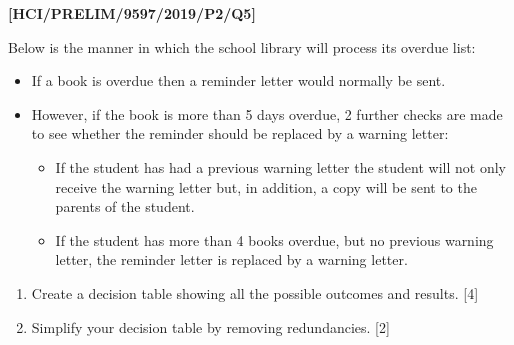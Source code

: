 \item \textbf{{[}HCI/PRELIM/9597/2019/P2/Q5{]} }

Below is the manner in which the school library will process its overdue
list:
\begin{itemize}
\item If a book is overdue then a reminder letter would normally be sent.
\item However, if the book is more than 5 days overdue, 2 further checks
are made to see whether the reminder should be replaced by a warning
letter:
\begin{itemize}
\item If the student has had a previous warning letter the student will
not only receive the warning letter but, in addition, a copy will
be sent to the parents of the student.
\item If the student has more than 4 books overdue, but no previous warning
letter, the reminder letter is replaced by a warning letter.
\end{itemize}
\end{itemize}
\begin{enumerate}
\item Create a decision table showing all the possible outcomes and results.
\hfill{}{[}4{]}
\item Simplify your decision table by removing redundancies. \hfill{}{[}2{]}
\end{enumerate}